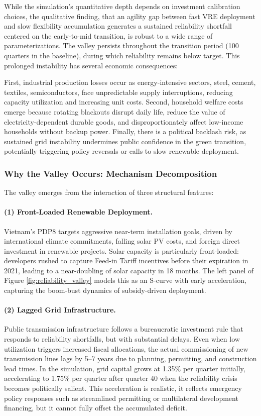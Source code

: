 \documentclass[12pt, a4paper]{article}
\begin{document}
	While the simulation's quantitative depth depends on investment calibration choices, the qualitative finding, that an agility gap between fast VRE deployment and slow flexibility accumulation generates a sustained reliability shortfall centered on the early-to-mid transition, is robust to a wide range of parameterizations. The valley persists throughout the transition period (100 quarters in the baseline), during which reliability remains below target. This prolonged instability has several economic consequences:
	
	First, industrial production losses occur as energy-intensive sectors, steel, cement, textiles, semiconductors, face unpredictable supply interruptions, reducing capacity utilization and increasing unit costs. Second, household welfare costs emerge because rotating blackouts disrupt daily life, reduce the value of electricity-dependent durable goods, and disproportionately affect low-income households without backup power. Finally, there is a political backlash risk, as sustained grid instability undermines public confidence in the green transition, potentially triggering policy reversals or calls to slow renewable deployment.
	
	\subsubsection{Why the Valley Occurs: Mechanism Decomposition}
	
	The valley emerges from the interaction of three structural features:
	
	\paragraph{(1) Front-Loaded Renewable Deployment.} Vietnam's PDP8 targets aggressive near-term installation goals, driven by international climate commitments, falling solar PV costs, and foreign direct investment in renewable projects. Solar capacity is particularly front-loaded: developers rushed to capture Feed-in Tariff incentives before their expiration in 2021, leading to a near-doubling of solar capacity in 18 months. The left panel of Figure \ref{fig:reliability_valley} models this as an S-curve with early acceleration, capturing the boom-bust dynamics of subsidy-driven deployment.
	
	\paragraph{(2) Lagged Grid Infrastructure.} Public transmission infrastructure follows a bureaucratic investment rule that responds to reliability shortfalls, but with substantial delays. Even when low utilization triggers increased fiscal allocations, the actual commissioning of new transmission lines lags by 5--7 years due to planning, permitting, and construction lead times. In the simulation, grid capital grows at 1.35\% per quarter initially, accelerating to 1.75\% per quarter after quarter 40 when the reliability crisis becomes politically salient. This acceleration is realistic, it reflects emergency policy responses such as streamlined permitting or multilateral development financing, but it cannot fully offset the accumulated deficit.
	
\end{document}
